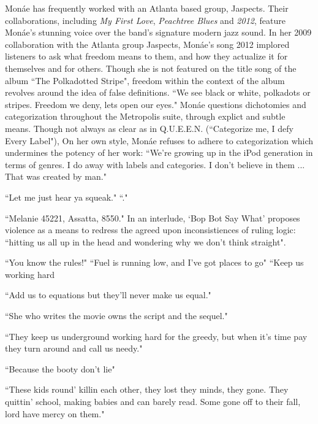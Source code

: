 \documentclass[11pt]{amsart}
\begin{document}
Mon\'ae has frequently worked with an Atlanta based group, Jaspects.
Their collaborations, including \emph{My First Love}, \emph{Peachtree Blues} and \emph{2012}, feature Mon\'ae's stunning voice over the band's signature modern jazz sound\cite{peachtreeblues}\cite{mytruelove}.
In her 2009 collaboration with the Atlanta group Jaspects, Mon\'ae's song 2012 implored listeners to ask what freedom means to them, and how they actualize it for themselves and for others.
Though she is not featured on the title song of the album ``The Polkadotted Stripe", freedom within the context of the album revolves around the idea of false definitions.
``We see black or white, polkadots or stripes. Freedom we deny, lets open our eyes."\cite{polkadottedstripe}
Mon\'ae questions dichotomies and categorization throughout the Metropolis suite, through explict and subtle means.
Though not always as clear as in Q.U.E.E.N. (``Categorize me, I defy Every Label"\cite{queen}), 
On her own style, Mon\'ae refuses to adhere to categorization which undermines the potency of her work:
``We’re growing up in the iPod generation in terms of genres. I do away with labels and categories. I don’t believe in them ... That was created by man."\cite{chronreview}




``Let me just hear ya squeak."\cite{happyhunting}
``."\cite{happyhunting}

``Melanie 45221, Assatta, 8550."\cite{chromeshoppe}
In an interlude, `Bop Bot Say What' proposes violence as a means to redress the agreed upon inconsistiences of ruling logic: ``hitting us all up in the head and wondering why we don't think straight"\cite{chromeshoppe}.

``You know the rules!"\cite{happyhunting}
``Fuel is running low, and I've got places to go"\cite{mrpresident}
``Keep us working hard 

``Add us to equations but they'll never make us equal."\cite{queen}

``She who writes the movie owns the script and the sequel."\cite{queen}

``They keep us underground working hard for the greedy, but when it's time pay they turn around and call us needy."\cite{queen}

``Because the booty don't lie"\cite{queen}

``These kids round' killin each other, they lost they minds, they gone. They quittin' school, making babies and can barely read. Some gone off to their fall, lord have mercy on them."\cite{sincerelyjane}
\end{document}
